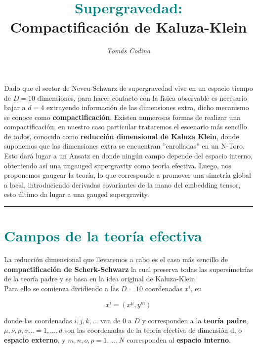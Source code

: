 \documentclass{article}
\title{\vspace{-35pt}\huge{\textbf{\textcolor{teal}{Supergravedad:}}} \\ \vspace{0.1cm} \large{\textbf{Compactificación de Kaluza-Klein}}}
\date{\vspace{-20pt}}
\author{\textit{Tomás Codina}}
\numberwithin{equation}{section}
\begin{document}
\maketitle
\thispagestyle{fancy}






Dado que el sector de Neveu-Schwarz de supergravedad vive en un espacio tiempo de $ D=10 $ dimensiones, para hacer contacto con la física observable es necesario bajar a $ d=4 $ extrayendo información de las dimensiones extra, dicho  mecanismo se conoce como \textbf{compactificación}. Existen numerosas formas de realizar una compactificación, en nuestro caso particular trataremos el escenario más sencillo de todos, conocido como \textbf{reducción dimensional de Kaluza Klein}, donde suponemos que las dimensiones extra se encuentran ''enrolladas'' en un N-Toro. Esto dará lugar a un Ansatz en donde ningún campo depende del espacio interno, obteniendo así una ungauged supergravity como teoría efectiva. Luego, nos proponemos gaugear la teoría, lo que corresponde a promover una simetría global a local, introduciendo derivadas covariantes de la mano del embedding tensor, esto último da lugar a una gauged supergravity. 

\rule{\textwidth}{0.4pt}

\section{\textcolor{teal}{Campos de la teoría efectiva}}\label{sec_preliminares}

La reducción dimensional que llevaremos a cabo es el caso más sencillo de \textbf{compactificación de Scherk-Schwarz} la cual preserva todas las supersimetrías de la teoría padre y se basa en la idea original de Kaluza-Klein.\\

Para ello se comienza dividiendo a las $ D=10 $ coordenadas $ x^{i} $, en

\begin{equation}
x^i = (x^{\mu},y^m)
\end{equation}

donde las coordenadas $ i,j,k,... $ van de $ 0 $ a $ D $ y corresponden a la \textbf{teoría padre}, $\mu,\nu,\rho,\sigma...=1,...,d $ son las coordenadas de la teoría efectiva de dimensión d, o \textbf{espacio externo}, y $ m,n,o,p=1,...,N $ corresponden al \textbf{espacio interno}.
\end{document}
